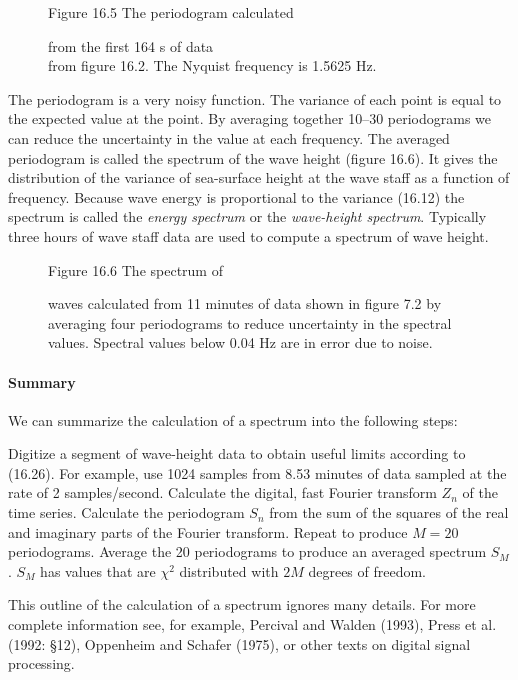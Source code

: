\begin{figure}[t!]
\footnotesize
\centering
Figure 16.5 The periodogram calculated \rule{0mm}{3ex}from the first 164 s of
data\\from figure 16.2. The Nyquist frequency is 1.5625 Hz.
\label{fig:periodogram}
\vspace{-3ex}
\end{figure}

The periodogram is a very noisy function. The variance of each point is equal to the expected
value at the point. By averaging together 10--30 periodograms we can reduce the uncertainty in
the value at each frequency. The averaged periodogram is called the spectrum of the wave
height (figure 16.6). It gives the distribution of the variance of sea-surface height at the
wave staff as a function of frequency. Because wave energy is proportional to the variance
(16.12) the spectrum is called the \textit{energy spectrum}
or the
\textit{wave-height spectrum}. Typically three hours of
wave staff data are used to compute a spectrum of wave height.

\begin{figure}[t!]
\footnotesize
Figure 16.6 The spectrum of \rule{0mm}{4ex}waves calculated from 11 minutes of
data shown in figure 7.2 by averaging four periodograms to reduce uncertainty in
the spectral values. Spectral values below 0.04 Hz are in error due to noise.
\label{fig:wavespectrum}
\vspace{-3ex}
\end{figure}

\paragraph{Summary}
We can summarize the calculation of a spectrum into the following steps:
\begin{enumerate}
\vitem
Digitize a segment of wave-height data to obtain useful limits according to
(16.26). For example, use 1024 samples from 8.53 minutes of data sampled at
the rate of 2 samples/second.
\vitem
Calculate the digital, fast Fourier transform $Z_{n}$ of the time series.
\vitem
Calculate the periodogram $S_{n}$ from the sum of the squares of the real and
imaginary parts of the Fourier transform.
\vitem
Repeat to produce $M=20$ periodograms.
\vitem
Average the 20 periodograms to produce an averaged spectrum $S_{M}$.
\vitem
$S_{M}$ has values that are $\chi ^{2}$ distributed with $2 M$ degrees of
freedom.
\end{enumerate}
This outline of the calculation of a spectrum ignores many details. For more
complete information see, for example, Percival and Walden (1993), Press et al.
(1992: \S 12), Oppenheim and Schafer (1975), or other texts on digital signal
processing.

